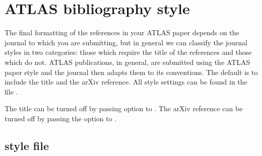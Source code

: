 \documentclass[UKenglish, texlive=2016]{atlasdoc}
\begin{document}
\section{ATLAS bibliography style}
\label{sec:atlasbst}

The final formatting of the references in your ATLAS paper depends on the journal to which you are submitting,
but in general we can classify the journal styles in two categories:
those which require the title of the references and those which do not.
ATLAS publications, in general, are submitted using the ATLAS paper style
and the journal then adapts them to its conventions.
The default is to include the title and the arXiv reference.
All  style settings can be found in the file .

The title can be turned off by passing option  to .
The arXiv reference can be turned off by passing the option  to .


\subsection{ style file}
\end{document}
